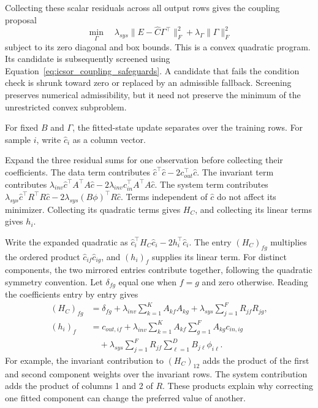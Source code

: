 Collecting these scalar residuals across all output rows gives the coupling proposal
\begin{equation}
\label{eq:icsor_coupling_update}
\min_{\Gamma}\quad
\lambda_{sys}\|E-\widehat C\Gamma^\top\|_F^2+
\lambda_{\Gamma}\|\Gamma\|_F^2
\end{equation}
subject to its zero diagonal and box bounds. This is a convex quadratic program. Its candidate is subsequently screened using Equation~\eqref{eq:icsor_coupling_safeguards}. A candidate that fails the condition check is shrunk toward zero or replaced by an admissible fallback. Screening preserves numerical admissibility, but it need not preserve the minimum of the unrestricted convex subproblem.

For fixed \(B\) and \(\Gamma\), the fitted-state update separates over the training rows. For sample \(i\), write \(\widehat c_i\) as a column vector.

Expand the three residual sums for one observation before collecting their coefficients. The data term contributes \(\widehat c^\top\widehat c-2c_{out}^\top\widehat c\). The invariant term contributes \(\lambda_{inv}\widehat c^\top A^\top A\widehat c-2\lambda_{inv}c_{in}^\top A^\top A\widehat c\). The system term contributes \(\lambda_{sys}\widehat c^\top R^\top R\widehat c-2\lambda_{sys}(B\phi)^\top R\widehat c\). Terms independent of \(\widehat c\) do not affect its minimizer. Collecting its quadratic terms gives \(H_C\), and collecting its linear terms gives \(h_i\).

Write the expanded quadratic as \(\widehat c_i^\top H_C\widehat c_i-2h_i^\top\widehat c_i\). The entry \((H_C)_{fg}\) multiplies the ordered product \(\widehat c_{if}\widehat c_{ig}\), and \((h_i)_f\) supplies its linear term. For distinct components, the two mirrored entries contribute together, following the quadratic symmetry convention. Let \(\delta_{fg}\) equal one when \(f=g\) and zero otherwise. Reading the coefficients entry by entry gives
\begin{equation}
\label{eq:icsor_state_scalar_coefficients}
\begin{aligned}
(H_C)_{fg}&=\delta_{fg}+\lambda_{inv}\sum_{k=1}^{K}A_{kf}A_{kg}
+\lambda_{sys}\sum_{j=1}^{F}R_{jf}R_{jg},\\
(h_i)_f&=c_{out,if}
+\lambda_{inv}\sum_{k=1}^{K}A_{kf}\sum_{g=1}^{F}A_{kg}c_{in,ig}\\
&\quad+\lambda_{sys}\sum_{j=1}^{F}R_{jf}\sum_{\ell=1}^{D}B_{j\ell}\phi_{i\ell}.
\end{aligned}
\end{equation}
For example, the invariant contribution to \((H_C)_{12}\) adds the product of the first and second component weights over the invariant rows. The system contribution adds the product of columns 1 and 2 of \(R\). These products explain why correcting one fitted component can change the preferred value of another.

